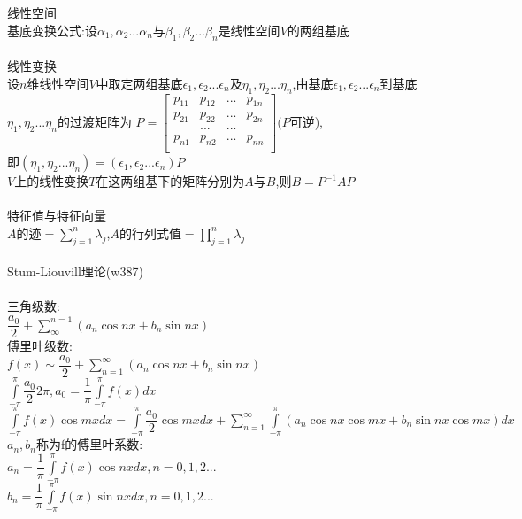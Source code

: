 \documentclass[11pt, a4paper, UTF8]{ctexart}
\begin{document}
\indent\\
\large\\
线性空间\\
基底变换公式:设$ \alpha_1,\alpha_2...\alpha_n $与$ \beta_1,\beta_2...\beta_n $是线性空间$ V $的两组基底\\
\\
线性变换\\
设$ n $维线性空间$ V $中取定两组基底$ \epsilon_1,\epsilon_2...\epsilon_n $及$ \eta_1,\eta_2...\eta_n $,由基底$ \epsilon_1,\epsilon_2...\epsilon_n $到基底$ \eta_1,\eta_2...\eta_n $的过渡矩阵为
$ P= 
\left[      
\begin{array}{cccc}
p_{11}&p_{12}&...&p_{1n}\\
p_{21}&p_{22}&...&p_{2n}\\
\ &...&...&\ \\
p_{n1}&p_{n2}&...&p_{nn}\\
\end{array}
\right](P$可逆),\\
即$ (\eta_1,\eta_2...\eta_n)=(\epsilon_1,\epsilon_2...\epsilon_n)P $\\
$ V $上的线性变换$ T $在这两组基下的矩阵分别为$ A $与$ B $,则$ B=P^{-1}AP $\\
\\
特征值与特征向量\\
$ A $的迹$ =\sum\limits_{j=1}^{n}\lambda_j $,$ A $的行列式值$ =\prod\limits_{j=1}^{n}\lambda_j $\\
\\
Stum-Liouvill理论(w387)\\
\\
三角级数:\\
$ \dfrac{a_0}{2}+\sum\limits_{\infty}^{n=1}(a_n\cos nx+b_n\sin nx) $\\
傅里叶级数:\\
$ f(x)\sim \dfrac{a_0}{2}+\sum\limits^{\infty}_{n=1}(a_n\cos nx+b_n\sin nx) $\\
$ \int\limits_{-\pi}^{\pi}\dfrac{a_0}{2}2\pi,a_0=\dfrac{1}{\pi}\int\limits_{-\pi}^{\pi}f(x)dx $\\
$ \int\limits_{-\pi}^{\pi}f(x)\cos mxdx=\int\limits_{-\pi}^{\pi}\dfrac{a_0}{2}\cos mxdx+\sum\limits_{n=1}^{\infty}\int\limits_{-\pi}^{\pi}(a_n\cos nx\cos mx+b_n\sin nx\cos mx)dx $\\
$ a_n,b_n $称为f的傅里叶系数:\\
$ a_n=\dfrac{1}{\pi}\int\limits_{-\pi}^{\pi}f(x)\cos nxdx,n=0,1,2... $\\
$ b_n=\dfrac{1}{\pi}\int\limits_{-\pi}^{\pi}f(x)\sin nxdx,n=0,1,2... $\\
\end{document}
